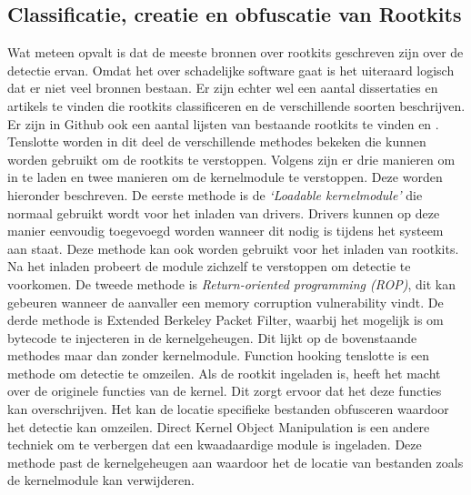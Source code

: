 \subsection{Classificatie, creatie en obfuscatie van Rootkits}
Wat meteen opvalt is dat de meeste bronnen over rootkits geschreven zijn over de detectie ervan. Omdat het over schadelijke software gaat is het uiteraard logisch dat er niet veel bronnen bestaan. Er zijn echter wel een aantal dissertaties en artikels te vinden die rootkits classificeren en de verschillende soorten beschrijven\autocite{lacombe2008rootkit}. Er zijn in Github ook een aantal lijsten van bestaande rootkits te vinden \autocite{skyw4tch3rRootkitsList} en \autocite{nagy2025detecting}. 
Tenslotte worden in dit deel de verschillende methodes bekeken die kunnen worden gebruikt om de rootkits te verstoppen. Volgens \textcite{nagy2025detecting} zijn er drie manieren om in te laden en twee manieren om de kernelmodule te verstoppen. Deze worden hieronder beschreven. De eerste methode is de \emph{‘Loadable kernelmodule’} die normaal gebruikt wordt voor het inladen van drivers. Drivers kunnen op deze manier eenvoudig toegevoegd worden wanneer dit nodig is tijdens het systeem aan staat. Deze methode kan ook worden gebruikt voor het inladen van rootkits. Na het inladen probeert de module zichzelf te verstoppen om detectie te voorkomen.
De tweede methode is \emph{Return-oriented programming (ROP)}, dit kan gebeuren wanneer de aanvaller een  memory corruption vulnerability vindt. 
De derde methode is Extended Berkeley Packet Filter, waarbij het mogelijk is om bytecode te injecteren in de kernelgeheugen. Dit lijkt op de bovenstaande methodes maar dan zonder kernelmodule.
Function hooking tenslotte is een methode om detectie te omzeilen. Als de rootkit ingeladen is, heeft het macht over de originele functies van de kernel. Dit zorgt ervoor dat het deze functies kan overschrijven. Het kan de locatie specifieke bestanden obfusceren waardoor het detectie kan omzeilen. Direct Kernel Object Manipulation is een andere techniek om te verbergen dat een kwaadaardige module is ingeladen. Deze methode past de kernelgeheugen aan waardoor het de locatie van bestanden zoals de kernelmodule kan verwijderen.
